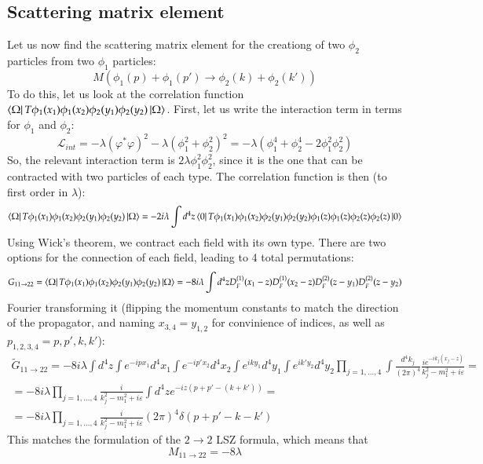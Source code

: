 \documentclass{article}
\begin{document}
\subsection{Scattering matrix element}
Let us now find the scattering matrix element for the creationg of two $\phi_2$ particles from two $\phi_1$ particles:
\begin{equation}
    M(\phi_1(p) + \phi_1(p') \rightarrow \phi_2(k) + \phi_2(k'))
\end{equation}
To do this, let us look at the correlation function $\bra{\Omega}T\phi_1(x_1)\phi_1(x_2)\phi_2(y_1)\phi_2(y_2)\ket{\Omega}$. First, let us write the interaction term in terms for $\phi_1$ and $\phi_2$:
\begin{equation}
    \mathcal{L}_{int} = -\lambda(\varphi^*\varphi)^2 - \lambda(\phi_1^2 + \phi_2^2)^2 = -\lambda(\phi_1^4 + \phi_2^4 - 2\phi_1^2\phi_2^2)
\end{equation}
So, the relevant interaction term is $2\lambda\phi_1^2\phi_2^2$, since it is the one that can be contracted with two particles of each type. The correlation function is then (to first order in $\lambda$):
\begin{equation}
    \bra{\Omega}T\phi_1(x_1)\phi_1(x_2)\phi_2(y_1)\phi_2(y_2)\ket{\Omega} =
    -2i\lambda \int d^4z \bra{0}T\phi_1(x_1)\phi_1(x_2)\phi_2(y_1)\phi_2(y_2)\phi_1(z)\phi_1(z)\phi_2(z)\phi_2(z)\ket{0}
\end{equation}
Using Wick's theorem, we contract each field with its own type. There are two options for the connection of each field, leading to 4 total permutations:
\begin{equation}
    G_{11\rightarrow22} = \bra{\Omega}T\phi_1(x_1)\phi_1(x_2)\phi_2(y_1)\phi_2(y_2)\ket{\Omega} = -8i\lambda \int d^4z D_F^{(1)}(x_1 - z) D_F^{(1)}(x_2 - z) D_F^{(2)}(z - y_1) D_F^{(2)}(z - y_2)
\end{equation}
Fourier transforming it (flipping the momentum constants to match the direction of the propagator, and naming $x_{3,4} = y_{1,2}$ for convinience of indices, as well as $p_{1,2,3,4} = p, p', k, k'$):
\begin{equation}
\begin{gathered}
    \tilde{G}_{11\rightarrow22} = -8i\lambda \int d^4z \int e^{-ipx_1} d^4x_1 \int  e^{-ip'x_2} d^4x_2 \int e^{iky_1} d^4y_1 \int e^{ik'y_2} d^4y_2 \prod_{j=1,\dots,4} \int \frac{d^4k_j}{(2\pi)^4}\frac{ie^{-ik_j(x_j - z)}}{k_j^2 - m_1^2 + i\varepsilon} = \\ =
    -8i\lambda \prod_{j=1,\dots,4} \frac{i}{k_j^2 - m_1^2 + i\varepsilon} \int d^4z e^{-iz(p + p' - (k + k'))} = \\ =
    -8i\lambda \prod_{j=1,\dots,4} \frac{i}{k_j^2 - m_1^2 + i\varepsilon} (2\pi)^4\delta(p + p' - k - k')
\end{gathered}
\end{equation}
This matches the formulation of the $2 \rightarrow 2$ LSZ formula, which means that
\begin{equation}
    M_{11 \rightarrow 22} = -8\lambda
\end{equation}
\newpage
\end{document}
